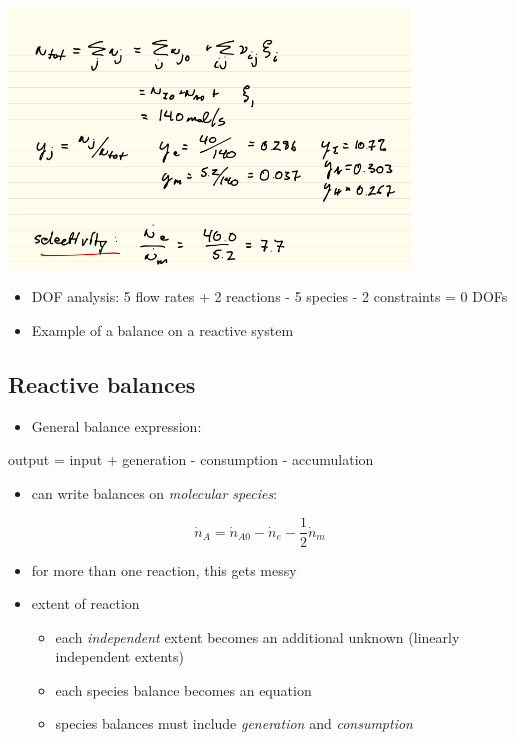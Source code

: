 \documentclass[11pt]{article}
\begin{document}
\includegraphics[width=0.8\textwidth]{./figs/Multirxn2.png}

\begin{itemize}
\item DOF analysis: 5 flow rates + 2 reactions - 5 species - 2 constraints = 0 DOFs
\item Example of a balance on a reactive system
\end{itemize}

\subsection{Reactive balances}
\label{sec-6-5}
\begin{itemize}
\item General balance expression:
\end{itemize}
\begin{framed}
output = input + generation - consumption - accumulation
\end{framed}

\begin{itemize}
\item can write balances on \emph{molecular species}:
\end{itemize}

\[ \dot{n}_{A} = \dot{n}_{A0} - \dot{n}_{e} - \frac{1}{2}\dot{n}_{m} \]

\begin{itemize}
\item for more than one reaction, this gets messy

\item extent of reaction
\begin{itemize}
\item each \emph{independent} extent becomes an additional unknown (linearly independent extents)
\item each species balance becomes an equation
\item species balances must include \emph{generation} and \emph{consumption}
\end{itemize}
\end{itemize}
\end{document}
